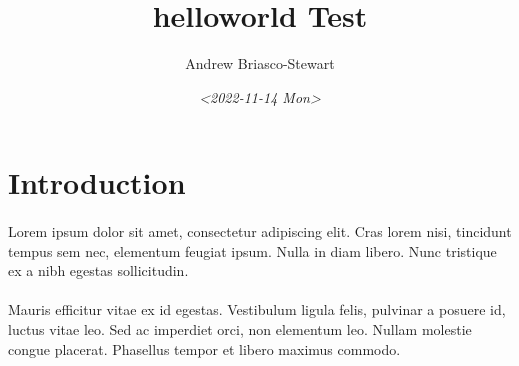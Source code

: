 \documentclass[11pt]{article}
\author{Andrew Briasco-Stewart}
\date{\textit{<2022-11-14 Mon>}}
\title{helloworld Test}
\begin{document}
\maketitle

\section{Introduction}
\label{sec:org141b34b}

\paragraph{}
Lorem ipsum dolor sit amet, consectetur adipiscing elit. Cras lorem
nisi, tincidunt tempus sem nec, elementum feugiat ipsum. Nulla in
diam libero. Nunc tristique ex a nibh egestas sollicitudin.

\paragraph{}
Mauris efficitur vitae ex id egestas. Vestibulum ligula felis,
pulvinar a posuere id, luctus vitae leo. Sed ac imperdiet orci, non
elementum leo. Nullam molestie congue placerat. Phasellus tempor et
libero maximus commodo.
\end{document}
